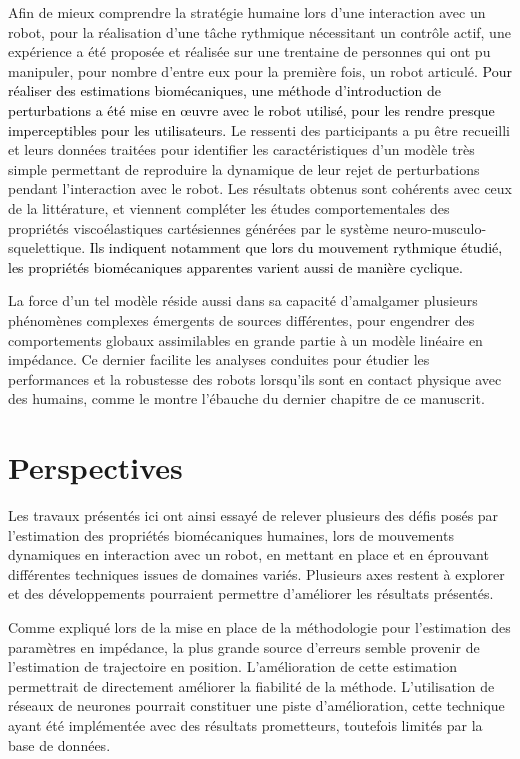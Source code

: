 Afin de mieux comprendre la stratégie humaine lors d'une interaction avec un robot, pour la réalisation d'une tâche rythmique nécessitant un contrôle actif, une expérience a été proposée et réalisée sur une trentaine de personnes qui ont pu manipuler, pour nombre d'entre eux pour la première fois, un robot articulé. \textcolor{black}{Pour réaliser des estimations biomécaniques, une méthode d'introduction de perturbations a été mise en œuvre avec le robot utilisé, pour les rendre presque imperceptibles pour les utilisateurs.} Le ressenti des participants a pu être recueilli et leurs données traitées pour identifier les caractéristiques d'un modèle très simple permettant de reproduire la dynamique de leur rejet de perturbations pendant l'interaction avec le robot. Les résultats obtenus sont cohérents avec ceux de la littérature, et viennent compléter les études comportementales des propriétés viscoélastiques cartésiennes générées par le système neuro-musculo-squelettique. \textcolor{black}{Ils indiquent notamment que lors du mouvement rythmique étudié, les propriétés biomécaniques apparentes varient aussi de manière cyclique.}

La force d'un tel modèle réside aussi dans sa capacité d'amalgamer plusieurs phénomènes complexes émergents de sources différentes, pour engendrer des comportements globaux assimilables en grande partie à un modèle linéaire en impédance. Ce dernier facilite les analyses conduites pour étudier les performances et la robustesse des robots lorsqu'ils sont en contact physique avec des humains, comme le montre l'ébauche du dernier chapitre de ce manuscrit.

\section{Perspectives}

Les travaux présentés ici ont ainsi essayé de relever plusieurs des défis posés par l'estimation des propriétés biomécaniques humaines, lors de mouvements dynamiques en interaction avec un robot, en mettant en place et en éprouvant différentes techniques issues de domaines variés. Plusieurs axes restent à explorer et des développements pourraient permettre d'améliorer les résultats présentés.

Comme expliqué lors de la mise en place de la méthodologie pour l'estimation des paramètres en impédance, la plus grande source d'erreurs semble provenir de l'estimation de trajectoire en position. L'amélioration de cette estimation permettrait de directement améliorer la fiabilité de la méthode. L'utilisation de réseaux de neurones pourrait constituer une piste d'amélioration, cette technique ayant été implémentée avec des résultats prometteurs, toutefois limités par la base de données.

